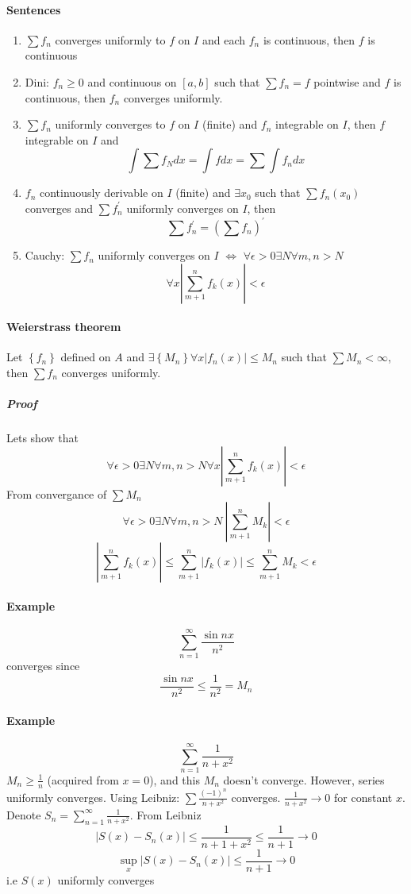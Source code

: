\paragraph{Sentences}
\begin{enumerate}
	\item $\sum f_n$ converges uniformly to $f$ on $I$ and each $f_n$ is continuous, then $f$ is continuous
	\item Dini: $f_n \geq 0$ and continuous on $[a,b]$ such that $\sum f_n = f$ pointwise and $f$ is continuous, then $f_n$ converges uniformly.
	\item $\sum f_n$ uniformly converges to $f$ on $I$ (finite) and $f_n$ integrable on $I$, then $f$ integrable on $I$ and
	$$\int \sum f_N dx =\int f dx = \sum \int  f_n dx$$
	\item $f_n$ continuously derivable on $I$ (finite) and $\exists x_0$ such that $\sum f_n(x_0)$ converges and $\sum f_n^\prime $ uniformly converges on $I$, then
	$$\sum f^\prime_n = \left(\sum f_n\right)^\prime$$
	\item Cauchy: $\sum f_n $ uniformly converges  on $I$ $\iff$ $\forall \epsilon > 0 \exists N \forall m,n > N$
	$$\forall x \left|\sum_{m+1}^n f_k(x)\right| < \epsilon$$ 
\end{enumerate}
\paragraph{Weierstrass theorem}
Let $\left\{ f_n\right\}$ defined on $A$ and $\exists \left\{M_n\right\} \forall x \left|f_n(x)\right|\leq M_n$ such that $\sum M_n < \infty$, then $\sum f_n$ converges uniformly.
\subparagraph{Proof}
Lets show that $$\forall \epsilon > 0 \exists N \forall m,n > N \forall x \left|\sum_{m+1}^n f_k(x)\right| < \epsilon$$
From convergance of $\sum M_n$  $$\forall \epsilon > 0 \exists N \forall m,n > N \: \left|\sum_{m+1}^n M_k \right| < \epsilon$$
$$\left|\sum_{m+1}^n f_k(x)\right| \leq \sum_{m+1}^n \left| f_k(x)\right| \leq \sum_{m+1}^n M_k  < \epsilon$$
\paragraph{Example}
$$\sum_{n=1}^{\infty} \frac{\sin nx}{n^2}$$
converges since
$$\frac{\sin nx}{n^2} \leq \frac{1}{n^2} = M_n$$
\paragraph{Example}
$$\sum_{n=1}^{\infty} \frac{1}{n+x^2}$$
$M_n \geq \frac{1}{n}$ (acquired from $x=0$), and this $M_n$ doesn't converge.
However, series uniformly converges. Using Leibniz:
$\sum \frac{(-1)^n}{n+x^2}$ converges. $\frac{1}{n+x^2} \to 0$ for constant $x$. 
Denote $S_n =  \sum_{n=1}^{\infty} \frac{1}{n+x^2}$. From Leibniz
$$\left| S(x) - S_n(x) \right| \leq \frac{1}{n+1+x^2} \leq \frac{1}{n+1} \to 0$$
$$\sup_x \left| S(x) - S_n(x) \right| \leq \frac{1}{n+1} \to 0$$
i.e $S(x)$ uniformly converges
